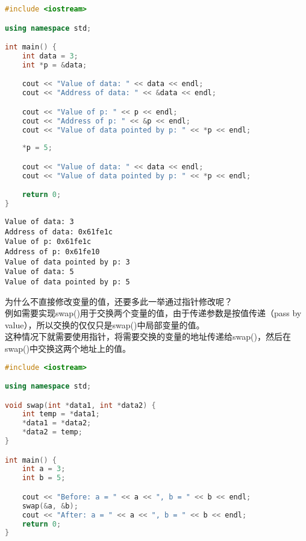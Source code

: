 
\begin{lstlisting}[language=C++]
#include <iostream>

using namespace std;

int main() {
    int data = 3;
    int *p = &data;

    cout << "Value of data: " << data << endl;
    cout << "Address of data: " << &data << endl;

    cout << "Value of p: " << p << endl;
    cout << "Address of p: " << &p << endl;
    cout << "Value of data pointed by p: " << *p << endl;
    
    *p = 5;

    cout << "Value of data: " << data << endl;
    cout << "Value of data pointed by p: " << *p << endl;

    return 0;
}
\end{lstlisting}

\begin{tcolorbox}
    \begin{verbatim}
Value of data: 3
Address of data: 0x61fe1c
Value of p: 0x61fe1c
Address of p: 0x61fe10
Value of data pointed by p: 3
Value of data: 5
Value of data pointed by p: 5
	\end{verbatim}
\end{tcolorbox}

为什么不直接修改变量的值，还要多此一举通过指针修改呢？\\

例如需要实现swap()用于交换两个变量的值，由于传递参数是按值传递（pass by value），所以交换的仅仅只是swap()中局部变量的值。\\

这种情况下就需要使用指针，将需要交换的变量的地址传递给swap()，然后在swap()中交换这两个地址上的值。\\


\begin{lstlisting}[language=C++]
#include <iostream>

using namespace std;

void swap(int *data1, int *data2) {
    int temp = *data1;
    *data1 = *data2;
    *data2 = temp;
}

int main() {
    int a = 3;
    int b = 5;

    cout << "Before: a = " << a << ", b = " << b << endl;
    swap(&a, &b);
    cout << "After: a = " << a << ", b = " << b << endl;
    return 0;
}
\end{lstlisting}

